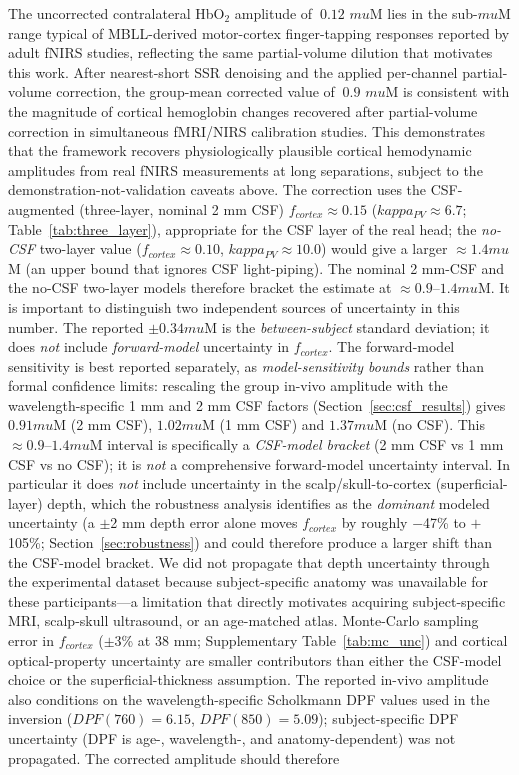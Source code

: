 \documentclass[11pt]{article}
\def\kappa{kappa}%
\def\mu{mu}%
\def\sim{~}%
\def\mathrm#1{#1}%
\def\,{ }%
\begin{document}
The uncorrected contralateral HbO$_2$ amplitude of ${\sim}0.12$\,$\mu$M lies in the sub-$\mu$M range typical of MBLL-derived motor-cortex finger-tapping responses reported by adult fNIRS studies\cite{r33,r34,r35}, reflecting the same partial-volume dilution that motivates this work. After nearest-short SSR denoising and the applied per-channel partial-volume correction, the group-mean corrected value of ${\sim}0.9$\,$\mu$M is consistent with the magnitude of cortical hemoglobin changes recovered after partial-volume correction in simultaneous fMRI/NIRS calibration studies\cite{r31,r32}. This demonstrates that the framework recovers physiologically plausible cortical hemodynamic amplitudes from real fNIRS measurements at long separations, subject to the demonstration-not-validation caveats above. The correction uses the CSF-augmented (three-layer, nominal 2\,mm CSF) $f_{\mathrm{cortex}}\approx0.15$ ($\kappa_{\mathrm{PV}}\approx6.7$; Table~\ref{tab:three_layer}), appropriate for the CSF layer of the real head; the \emph{no-CSF} two-layer value ($f_{\mathrm{cortex}}\approx0.10$, $\kappa_{\mathrm{PV}}\approx10.0$) would give a larger $\approx1.4\,\mu$M (an upper bound that ignores CSF light-piping). The nominal 2\,mm-CSF and the no-CSF two-layer models therefore bracket the estimate at $\approx0.9$--$1.4\,\mu$M. It is important to distinguish two independent sources of uncertainty in this number. The reported $\pm0.34\,\mu$M is the \emph{between-subject} standard deviation; it does \emph{not} include \emph{forward-model} uncertainty in $f_{\mathrm{cortex}}$. The forward-model sensitivity is best reported separately, as \emph{model-sensitivity bounds} rather than formal confidence limits: rescaling the group in-vivo amplitude with the wavelength-specific 1\,mm and 2\,mm CSF factors (Section~\ref{sec:csf_results}) gives $0.91\,\mu$M (2\,mm CSF), $1.02\,\mu$M (1\,mm CSF) and $1.37\,\mu$M (no CSF). This $\approx0.9$--$1.4\,\mu$M interval is specifically a \emph{CSF-model bracket} (2\,mm CSF vs 1\,mm CSF vs no CSF); it is \emph{not} a comprehensive forward-model uncertainty interval. In particular it does \emph{not} include uncertainty in the scalp/skull-to-cortex (superficial-layer) depth, which the robustness analysis identifies as the \emph{dominant} modeled uncertainty (a $\pm$2\,mm depth error alone moves $f_{\mathrm{cortex}}$ by roughly $-$47\% to $+$105\%; Section~\ref{sec:robustness}) and could therefore produce a larger shift than the CSF-model bracket. We did not propagate that depth uncertainty through the experimental dataset because subject-specific anatomy was unavailable for these participants---a limitation that directly motivates acquiring subject-specific MRI, scalp-skull ultrasound, or an age-matched atlas. Monte-Carlo sampling error in $f_{\mathrm{cortex}}$ ($\pm$3\% at 38\,mm; Supplementary Table~\ref{tab:mc_unc}) and cortical optical-property uncertainty are smaller contributors than either the CSF-model choice or the superficial-thickness assumption. The reported in-vivo amplitude also conditions on the wavelength-specific Scholkmann DPF values used in the inversion ($\mathrm{DPF}(760)=6.15$, $\mathrm{DPF}(850)=5.09$); subject-specific DPF uncertainty (DPF is age-, wavelength-, and anatomy-dependent) was not propagated. The corrected amplitude should therefore 
\end{document}
